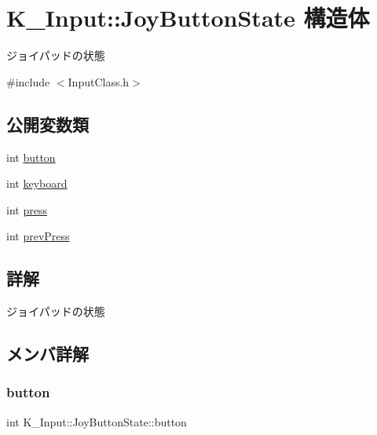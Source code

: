 \hypertarget{struct_k___input_1_1_joy_button_state}{}\section{K\+\_\+\+Input\+:\+:Joy\+Button\+State 構造体}
\label{struct_k___input_1_1_joy_button_state}


ジョイパッドの状態  




{\ttfamily \#include $<$Input\+Class.\+h$>$}

\subsection*{公開変数類}
\begin{DoxyCompactItemize}
\item 
int \mbox{\hyperlink{struct_k___input_1_1_joy_button_state_ac07ff312f24d47982c1e829db89e8872}{button}}
\item 
int \mbox{\hyperlink{struct_k___input_1_1_joy_button_state_ac8fed56b38ef36430f358fa13764f584}{keyboard}}
\item 
int \mbox{\hyperlink{struct_k___input_1_1_joy_button_state_a36a57c6df38bd54abb578b0da84de22c}{press}}
\item 
int \mbox{\hyperlink{struct_k___input_1_1_joy_button_state_a4c660bf9290e9b743b641e8ce7bcf386}{prev\+Press}}
\end{DoxyCompactItemize}


\subsection{詳解}
ジョイパッドの状態 

\subsection{メンバ詳解}
\mbox{\label{struct_k___input_1_1_joy_button_state_ac07ff312f24d47982c1e829db89e8872}} 
\subsubsection{\texorpdfstring{button}{button}}
{\footnotesize\ttfamily int K\+\_\+\+Input\+::\+Joy\+Button\+State\+::button}

